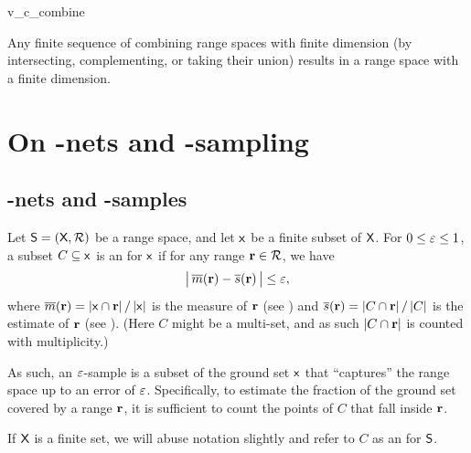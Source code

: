 \begin{fragment}{v_c_combine}
    \begin{corollary}
        Any finite sequence of combining range spaces with finite \VC
        dimension (by intersecting, complementing, or taking their
        union) results in a range space with a finite \VC dimension.
        
    \end{corollary}
\end{fragment}


\section{On -nets and
   -sampling}


\subsection{-nets and
   -samples}


\begin{defn}
    Let $\mathsf{S} = (\textsf{X},{\mathcal{R}})$ be a range space, and
    let $\mathsf{x}$ be a finite subset of $\textsf{X}$. For $0 \leq
    {\varepsilon} \leq 1$, a subset $C \subseteq \mathsf{x}$ is an
     for $\mathsf{x}$ if
    for any range $\mathbf{r} \in {\mathcal{R}}$, we have
    \begin{align*}
      \cardin{\, \Measure{\range} - \sMeasure{\range} \bigr.\, }%
      \leq%
      \eps,
    \end{align*}
    where
    $\Measure{\range} = {\cardin{\FGroundSet \cap \range}} \, /\,
    {\cardin{\FGroundSet}}$ is the measure of $\mathbf{r}$ (see
    ) and
    $\sMeasure{\range} = {\cardin{C \cap \range}} \, /\,{\cardin{C}}$
    is the estimate of $\mathbf{r}$ (see ).  (Here $C$
    might be a multi-set, and as such $\left| {C \cap \mathbf{r}} \right|$ is
    counted with multiplicity.)
\end{defn}

As such, an ${\varepsilon}$-sample is a subset of the ground set $\mathsf{x}$
that ``captures'' the range space up to an error of
${\varepsilon}$. Specifically, to estimate the fraction of the ground set
covered by a range $\mathbf{r}$, it is sufficient to count the points of
$C$ that fall inside $\mathbf{r}$.

If $\textsf{X}$ is a finite set, we will abuse notation slightly and
refer to $C$ as an 
for $\mathsf{S}$.

